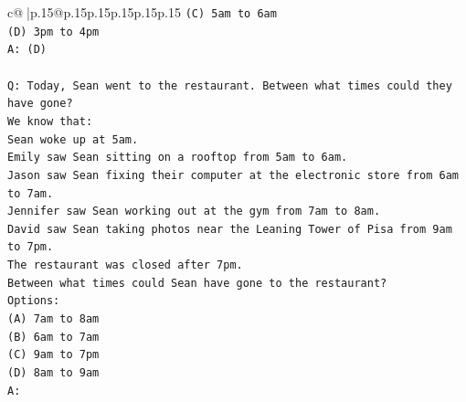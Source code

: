\documentclass{article}
\begin{document}
{\begin{supertabular}{c@{$\;$}|p{.15\linewidth}@{}p{.15\linewidth}p{.15\linewidth}p{.15\linewidth}p{.15\linewidth}p{.15\linewidth}}
{{{\texttt{(C) 5am to 6am} \\
\texttt{(D) 3pm to 4pm} \\
\texttt{A: (D)} \\
\\ 
\texttt{Q: Today, Sean went to the restaurant. Between what times could they have gone?} \\
\texttt{We know that:} \\
\texttt{Sean woke up at 5am.} \\
\texttt{Emily saw Sean sitting on a rooftop from 5am to 6am.} \\
\texttt{Jason saw Sean fixing their computer at the electronic store from 6am to 7am.} \\
\texttt{Jennifer saw Sean working out at the gym from 7am to 8am.} \\
\texttt{David saw Sean taking photos near the Leaning Tower of Pisa from 9am to 7pm.} \\
\texttt{The restaurant was closed after 7pm.} \\
\texttt{Between what times could Sean have gone to the restaurant?} \\
\texttt{Options:} \\
\texttt{(A) 7am to 8am} \\
\texttt{(B) 6am to 7am} \\
\texttt{(C) 9am to 7pm} \\
\texttt{(D) 8am to 9am} \\
\texttt{A:} \\
            }
        }
    }
     \\ \\


\end{supertabular}}
\end{document}
